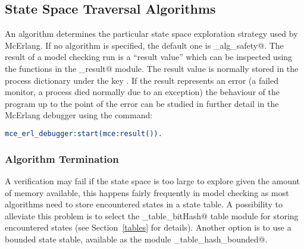 \documentclass[a4paper]{article}
\begin{document}
\subsection{State Space Traversal Algorithms}
An algorithm determines the particular state space exploration strategy
used by McErlang. 
If no algorithm is specified, the default one is \lstinline@mce_alg_safety@.
The result of a model checking run is a ``result value'' which can be
inspected using the functions in the \lstinline@mce_result@ module.
The result value is normally stored in the process dictionary under
the key \lstinline@result@.
If the result represents an error (a failed monitor, a process
died normally due to an exception) the behaviour of the program
up to the point of the error can be studied in further detail
in the McErlang debugger using the command:
\begin{lstlisting}[language=Erlang]
mce_erl_debugger:start(mce:result()).
\end{lstlisting}

\subsubsection{Algorithm Termination}


A verification may fail if the state space is too large to explore
given the amount of memory available, this happens fairly frequently
in model checking as most algorithms need to store encountered
states in a state table. A possibility to alleviate this problem is to
select the \lstinline@mce_table_bitHash@ table module for storing encountered
states (see Section~\ref{tables} for details).
Another option is to use a bounded state stable,
available as the module \lstinline@mce_table_hash_bounded@.
\end{document}
